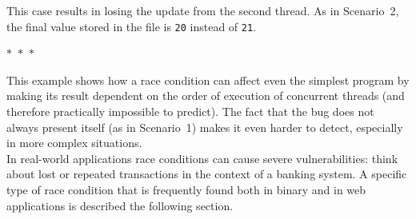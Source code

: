 This case results in losing the update from the second thread. As in Scenario~2, the final value stored in the file is \texttt{20} instead of \texttt{21}.

\begin{center}
  $\ast$~$\ast$~$\ast$
\end{center}

This example shows how a race condition can affect even the simplest program by making its result dependent on the order of execution of concurrent threads (and therefore practically impossible to predict). The fact that the bug does not always present itself (as in Scenario~1) makes it even harder to detect, especially in more complex situations. \\

In real-world applications race conditions can cause severe vulnerabilities: think about lost or repeated transactions in the context of a banking system. A specific type of race condition that is frequently found both in binary and in web applications is described the following section.
